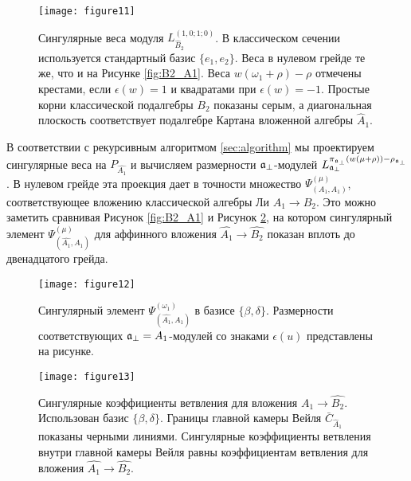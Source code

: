 \begin{figure}[h!tb]
  \texttt{[image: figure11]}
  \caption{Сингулярные веса модуля $L^{(1,0;1;0)}_{\hat B_2 }$. В классическом сечении используется стандартный базис  $\{e_1,e_2\}$. Веса в нулевом грейде те же, что и на Рисунке \ref{fig:B2_A1}. Веса  $w (\omega_1+\rho)-\rho$ отмечены крестами, если $\epsilon(w)=1$ и квадратами при $\epsilon(w)=-1$. Простые корни классической подалгебры  $B_2$ показаны серым, а диагональная плоскость соответствует подалгебре Картана вложенной алгебры $\hat{A}_1$.}
  \label{fig:affine_B2_anom_point}
\end{figure}

В соответствии с рекурсивным алгоритмом  \ref{sec:algorithm} мы проектируем сингулярные веса на $P_{\hat{A_1}}$ и вычисляем размерности $\mathfrak{a}_{\perp}$-модулей $L^{\pi_{\mathfrak{a}_{\perp}}(w(\mu+\rho))-\rho_{\mathfrak{a}_{\perp}}}_{\mathfrak{a}_{\perp}}$. В нулевом грейде эта проекция дает в точности множество $\Psi ^{\left( \mu \right) }_{\left(  A_1, A_1 \right)}$, соответствующее вложению классической алгебры Ли  $A_1\rightarrow B_2$. Это можно заметить сравнивая Рисунок \ref{fig:B2_A1} и Рисунок \ref{fig:AffineB2_A1_anom_proj}, на котором сингулярный элемент $\Psi ^{\left( \mu \right) }_{\left(  \widehat{A_1}, A_1 \right)}$ для аффинного вложения  $\hat{A_1}\to\hat{B_{2}}$  показан вплоть до двенадцатого грейда.
\begin{figure}[h!tb]
  \centering
  \texttt{[image: figure12]}
  \caption{Сингулярный элемент $\Psi ^{\left( \omega_1 \right) }_{\left(  \widehat{A_1}, A_1 \right)}$ в базисе $\{\beta,\delta\}$. Размерности соответствующих  $\mathfrak{a}_{\perp}=A_1$-модулей со знаками  $\epsilon(u)$ представлены на рисунке.}
  \label{fig:AffineB2_A1_anom_proj}
\end{figure}

\begin{figure}[h!bt]
  \centering
  \texttt{[image: figure13]}
  \caption{Сингулярные коэффициенты ветвления для вложения $\hat{A_1}\rightarrow \hat{B_2}$. Использован базис $\{\beta,\delta\}$. Границы главной камеры Вейля $\bar{C}_{\hat{A}_1}$ показаны черными линиями. Сингулярные коэффициенты ветвления внутри главной камеры Вейля равны коэффициентам ветвления для вложения $\hat{A_1}\rightarrow \hat{B_2}$.}
  \label{fig:AffineB2_A1_branching}
\end{figure}

